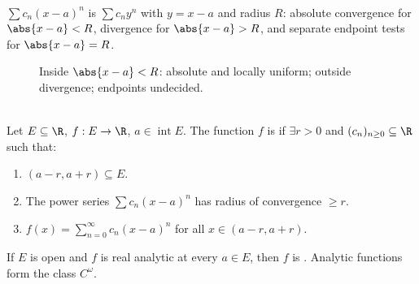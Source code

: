 \begin{perspective} \label{per:centered-power-series-translation} \\
$\sum c_n(x-a)^n$ is $\sum c_ny^n$ with $y=x-a$ and radius $R$: absolute convergence for $\abs{x-a}<R$, divergence for $\abs{x-a}>R$, and separate endpoint tests for $\abs{x-a}=R$.
\end{perspective}

\begin{figure}[H]
  \centering
  
\caption{Inside $\abs{x-a}<R$: absolute and locally uniform; outside divergence; endpoints undecided.}
  \label{fig:power-series-radius-interval}
\end{figure}

\begin{definition} \label{def:real-analytic-at-point} \\
Let $E\subseteq\R$, $f:E\to\R$, $a\in\operatorname{int}E$. The function $f$ is  if $\exists r>0$ and $(c_n)_{n\geq0}\subseteq\R$ such that:
\begin{enumerate}[label=(\roman*)]
\setlength{\itemsep}{0pt}
\item $(a-r,a+r)\subseteq E$.
\item The power series $\sum c_n(x-a)^n$ has radius of convergence $\geq r$.
\item $f(x)=\sum\limits_{n=0}^{\infty}c_n(x-a)^n$ for all $x\in(a-r,a+r)$.
\end{enumerate}
If $E$ is open and $f$ is real analytic at every $a\in E$, then $f$ is .
Analytic functions form the class $C^\omega$.
\end{definition}

